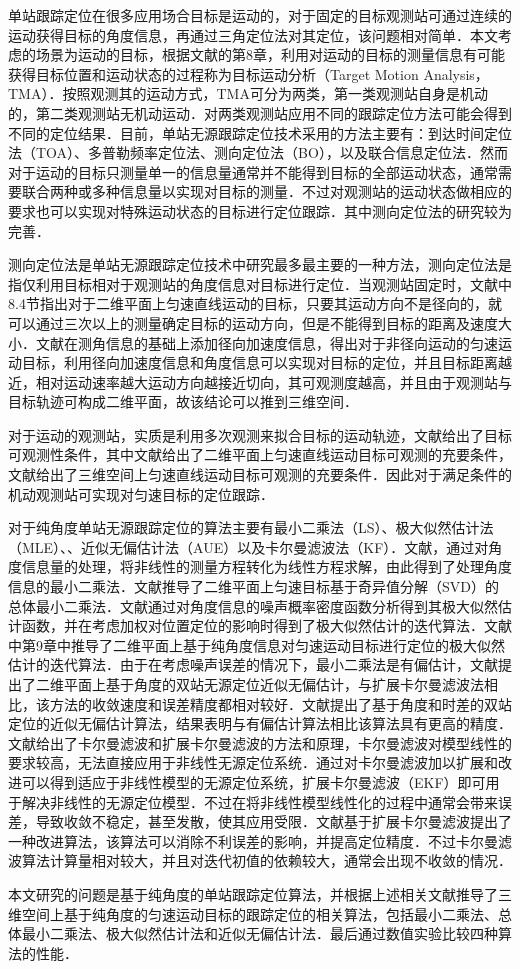 单站跟踪定位在很多应用场合目标是运动的，对于固定的目标观测站可通过连续的运动获得目标的角度信息，再通过三角定位法对其定位，该问题相对简单．本文考虑的场景为运动的目标，根据文献\cite{10}的第8章，利用对运动的目标的测量信息有可能获得目标位置和运动状态的过程称为目标运动分析（Target Motion Analysis，TMA）．按照观测其的运动方式，TMA可分为两类，第一类观测站自身是机动的，第二类观测站无机动运动．对两类观测站应用不同的跟踪定位方法可能会得到不同的定位结果．目前，单站无源跟踪定位技术采用的方法主要有\cite{11}：到达时间定位法（TOA）、多普勒频率定位法、测向定位法（BO），以及联合信息定位法．然而对于运动的目标只测量单一的信息量通常并不能得到目标的全部运动状态，通常需要联合两种或多种信息量以实现对目标的测量．不过对观测站的运动状态做相应的要求也可以实现对特殊运动状态的目标进行定位跟踪．其中测向定位法的研究较为完善．

测向定位法是单站无源跟踪定位技术中研究最多最主要的一种方法，测向定位法是指仅利用目标相对于观测站的角度信息对目标进行定位．当观测站固定时，文献\cite{10}中8.4节指出对于二维平面上匀速直线运动的目标，只要其运动方向不是径向的，就可以通过三次以上的测量确定目标的运动方向，但是不能得到目标的距离及速度大小．文献\cite{12}在测角信息的基础上添加径向加速度信息，得出对于非径向运动的匀速运动目标，利用径向加速度信息和角度信息可以实现对目标的定位，并且目标距离越近，相对运动速率越大运动方向越接近切向，其可观测度越高，并且由于观测站与目标轨迹可构成二维平面，故该结论可以推到三维空间．

对于运动的观测站，实质是利用多次观测来拟合目标的运动轨迹，文献\cite{bo1}\cite{bo2}给出了目标可观测性条件，其中文献\cite{bo1}给出了二维平面上匀速直线运动目标可观测的充要条件，文献\cite{bo2}给出了三维空间上匀速直线运动目标可观测的充要条件．因此对于满足条件的机动观测站可实现对匀速目标的定位跟踪．

对于纯角度单站无源跟踪定位的算法主要有最小二乘法（LS）、极大似然估计法（MLE）、、近似无偏估计法（AUE）以及卡尔曼滤波法（KF）．文献\cite{15}，\cite{wls2}通过对角度信息量的处理，将非线性的测量方程转化为线性方程求解，由此得到了处理角度信息的最小二乘法．文献\cite{16}推导了二维平面上匀速目标基于奇异值分解（SVD）的总体最小二乘法．文献\cite{15}通过对角度信息的噪声概率密度函数分析得到其极大似然估计函数，并在考虑加权对位置定位的影响时得到了极大似然估计的迭代算法．文献\cite{10}中第9章中推导了二维平面上基于纯角度信息对匀速运动目标进行定位的极大似然估计的迭代算法．由于在考虑噪声误差的情况下，最小二乘法是有偏估计，文献\cite{17}提出了二维平面上基于角度的双站无源定位近似无偏估计，与扩展卡尔曼滤波法相比，该方法的收敛速度和误差精度都相对较好．文献\cite{18}提出了基于角度和时差的双站定位的近似无偏估计算法，结果表明与有偏估计算法相比该算法具有更高的精度．文献\cite{19}给出了卡尔曼滤波和扩展卡尔曼滤波的方法和原理，卡尔曼滤波对模型线性的要求较高，无法直接应用于非线性无源定位系统．通过对卡尔曼滤波加以扩展和改进可以得到适应于非线性模型的无源定位系统，扩展卡尔曼滤波（EKF）即可用于解决非线性的无源定位模型．不过在将非线性模型线性化的过程中通常会带来误差，导致收敛不稳定，甚至发散，使其应用受限．文献\cite{20}基于扩展卡尔曼滤波提出了一种改进算法，该算法可以消除不利误差的影响，并提高定位精度．不过卡尔曼滤波算法计算量相对较大，并且对迭代初值的依赖较大，通常会出现不收敛的情况．

本文研究的问题是基于纯角度的单站跟踪定位算法，并根据上述相关文献推导了三维空间上基于纯角度的匀速运动目标的跟踪定位的相关算法，包括最小二乘法、总体最小二乘法、极大似然估计法和近似无偏估计法．最后通过数值实验比较四种算法的性能．
